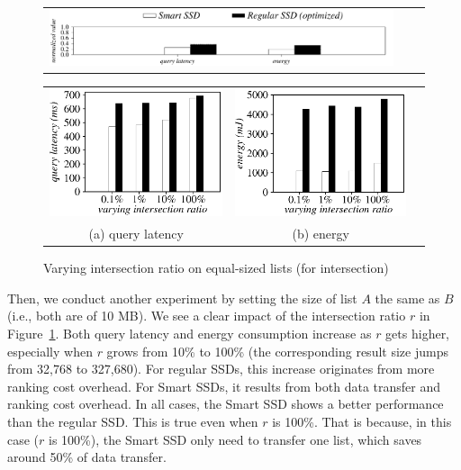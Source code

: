   \begin{figure}[tbp]
  \centering
    \begin{tabular}{ccc}
 \includegraphics[width=0.52\columnwidth]{figures/banner2.pdf}
\end{tabular}
\vspace{-0.1cm}
\renewcommand{\tabcolsep}{0.1mm}
  \begin{tabular}{ccc}
 \includegraphics[width=0.5\columnwidth]{figures/Intersection-time-VaryInterRatio-equal2.eps}&
  \includegraphics[width=0.5\columnwidth]{figures/Intersection-energy-VaryInterRatio-equal2.eps}\\
  (a) query latency & (b) energy\\
\end{tabular}
  \caption{Varying intersection ratio on equal-sized lists (for intersection)}
  \label{fig:varyInterRatioIntersection2}
 \end{figure}


Then, we conduct another experiment by setting the size of list $A$ the same as $B$ (i.e., both are of 10 MB). %
We see a clear impact of the intersection ratio $r$ in Figure~\ref{fig:varyInterRatioIntersection2}.
Both query latency and energy consumption increase as $r$ gets higher, especially when $r$ grows from 10\% to 100\% (the corresponding result size jumps from 32,768 to 327,680). For regular SSDs, this increase originates from more ranking cost overhead. For Smart SSDs, it results from both data transfer and ranking cost overhead.
In all cases, the Smart SSD shows a better performance than the regular SSD.
This is true even when $r$ is 100\%. That is because, in this case ($r$ is 100\%), the Smart SSD only need to transfer one list, which saves around 50\% of data transfer.



